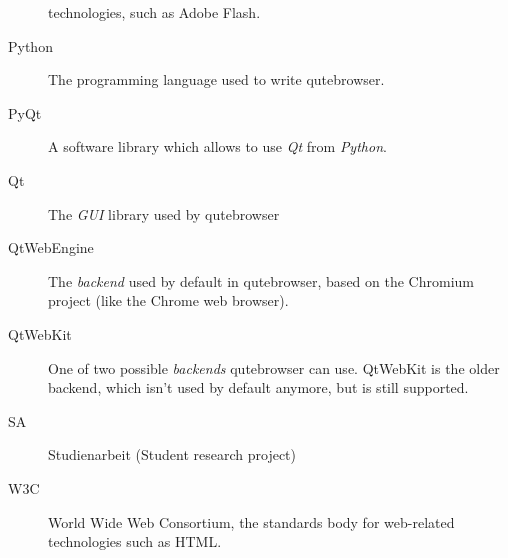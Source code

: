 \documentclass[a4paper,parskip=full]{scrreprt}
\begin{document}
\begin{appendices}
\begin{description}
{      technologies, such as Adobe Flash.}
  \item[Python]{The programming language used to write qutebrowser.}
  \item[PyQt]{A software library which allows to use \emph{Qt} from \emph{Python}.}
  \item[Qt]{The \emph{GUI} library used by qutebrowser}
  \item[QtWebEngine]{The \emph{backend} used by default in qutebrowser, based on
      the Chromium project (like the Chrome web browser).}
  \item[QtWebKit]{One of two possible \emph{backends} qutebrowser can use.
      QtWebKit is the older backend, which isn't used by default anymore, but is
      still supported.}
  \item[SA]{Studienarbeit (Student research project)}
  \item[W3C]{World Wide Web Consortium, the standards body for web-related
      technologies such as HTML.}
\end{description}

\renewcommand{\bibname}{\chapter{Literature and Sources}}
\printbibliography
\end{appendices}
\end{document}
